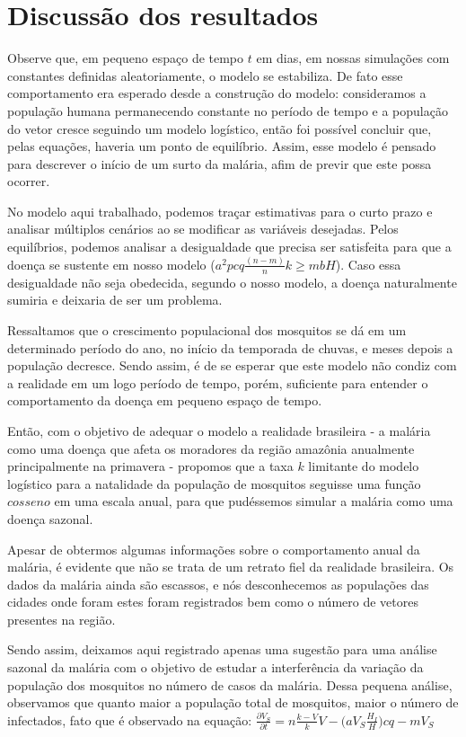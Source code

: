 \documentclass[
	12pt,				%
	openright,			%
	twoside,			%
	a4paper,			%
	english,			%
	french,				%
	spanish,			%
	brazil				%
	]{abntex2}
\begin{document}
\chapter*[Discussão dos resultados]{Discussão dos resultados}




Observe que, em pequeno espaço de tempo $t$ em dias, em nossas simulações com constantes definidas aleatoriamente, o modelo se estabiliza. De fato esse comportamento era esperado desde a construção do modelo: consideramos a população humana permanecendo constante no período de tempo e a população do vetor cresce seguindo um modelo logístico, então foi possível concluir que, pelas equações, haveria um ponto de equilíbrio. Assim, esse modelo é pensado para descrever o início de um surto da malária, afim de previr que este possa ocorrer. 

No modelo aqui trabalhado, podemos traçar estimativas para o curto prazo e analisar múltiplos cenários ao se modificar as variáveis desejadas. Pelos equilíbrios, podemos analisar a desigualdade que precisa ser satisfeita para que a doença se sustente em nosso modelo ($a^2p cq\frac{(n-m)}{n}k\ge mbH$). Caso essa desigualdade não seja obedecida, segundo o nosso modelo, a doença naturalmente sumiria e deixaria de ser um problema.


Ressaltamos que o crescimento populacional dos mosquitos se dá em um determinado período do ano, no início da temporada de chuvas, e meses depois a população decresce. Sendo assim, é de se esperar que este modelo não condiz com a realidade em um logo período de tempo, porém, suficiente para entender o comportamento da doença em pequeno espaço de tempo.

Então, com o objetivo de adequar o modelo a realidade brasileira - a malária como uma doença que afeta os moradores da região amazônia anualmente principalmente na primavera \cite{boletim} - propomos que a taxa $k$ limitante do modelo logístico para a natalidade da população de mosquitos
seguisse uma função $cosseno$ em uma escala anual, para que pudéssemos simular a malária como uma doença sazonal. 

Apesar de obtermos algumas informações sobre o comportamento anual da malária, é evidente que não se trata de um retrato fiel da realidade brasileira. Os dados da malária ainda são escassos, e nós desconhecemos as populações das cidades onde foram estes foram registrados bem como o número de vetores presentes na região. 

Sendo assim, deixamos aqui registrado apenas uma sugestão para uma análise sazonal da malária com o objetivo de estudar a interferência da variação da população dos mosquitos no número de casos da malária. Dessa pequena análise, observamos que quanto maior a população total de mosquitos, maior o número de infectados, fato que é observado na equação:  $ \frac{\partial V_S}{\partial t}= n\frac{k-V}{k}V-\Big(aV_S\frac{H_I}{H}\Big)cq-m V_S$
\end{document}
